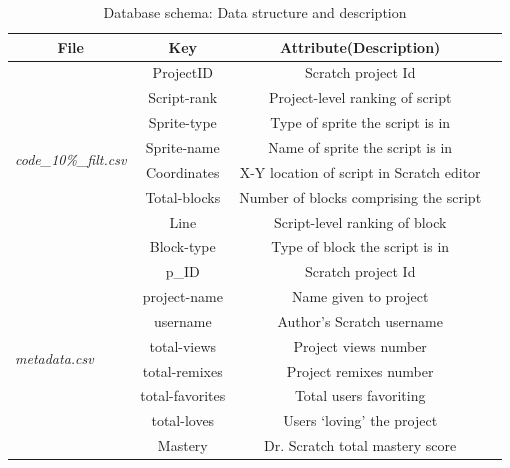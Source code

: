 \documentclass[a4paper,twocolumn,10pt]{article}
\begin{document}
\begin{table}[!ht]
  \centering\renewcommand{\arraystretch}{1.2}
   \begin{tabular}{@{}lccc@{}}
    \toprule
    \multicolumn{1}{c}{\textbf{File}} & \textbf{Key} &\textbf{Attribute(Description)} \\
    \midrule
    \multirow{8}{*}{\textit{code\_10\%\_filt.csv}} & ProjectID & Scratch project Id \\
                & Script-rank & Project-level ranking of script \\
                & Sprite-type & Type of sprite the script is in\\
                & Sprite-name & Name of sprite the script is in\\
                & Coordinates & X-Y location of script in Scratch editor\\
                & Total-blocks & Number of blocks comprising the script \\
                & Line & Script-level ranking of block \\
                & Block-type & Type of block the script is in\\
    \hline
    \multirow{8}{*}{\textit{metadata.csv}} & p\_ID & Scratch project Id \\
                & project-name & Name given to project \\
                & username & Author’s Scratch username\\
                & total-views & Project views number \\
                & total-remixes & Project remixes number \\
                & total-favorites & Total users favoriting \\
                & total-loves & Users ‘loving’ the project \\
                & Mastery & Dr. Scratch total mastery score\\
    \bottomrule
    \end{tabular}
    \caption{Database schema: Data structure and description}\label{tab:titlenew}
\end{table}
\end{document}
